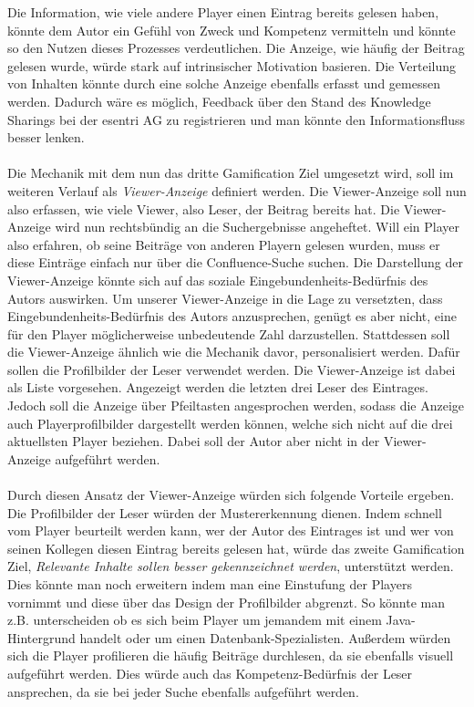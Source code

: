 \documentclass[a4paper,12pt,twoside]{scrartcl}
\begin{document}
Die Information, wie viele andere Player einen Eintrag bereits gelesen haben, könnte dem Autor ein Gefühl von Zweck und Kompetenz vermitteln und könnte so den Nutzen dieses Prozesses verdeutlichen. Die Anzeige, wie häufig der Beitrag gelesen wurde, würde stark auf intrinsischer Motivation basieren. Die Verteilung von Inhalten könnte durch eine solche Anzeige ebenfalls erfasst und gemessen werden. Dadurch wäre es möglich, Feedback über den Stand des Knowledge Sharings bei der esentri AG zu registrieren und man könnte den Informationsfluss besser lenken. 
\\\\
Die Mechanik mit dem nun das dritte Gamification Ziel umgesetzt wird, soll im weiteren Verlauf als \textit{Viewer-Anzeige} definiert werden. Die Viewer-Anzeige soll nun also erfassen, wie viele Viewer, also Leser, der Beitrag bereits hat. Die Viewer-Anzeige wird nun rechtsbündig an die Suchergebnisse angeheftet. Will ein Player also erfahren, ob seine Beiträge von anderen Playern gelesen wurden, muss er diese Einträge einfach nur über die Confluence-Suche suchen. Die Darstellung der Viewer-Anzeige könnte sich auf das soziale Eingebundenheits-Bedürfnis des Autors auswirken. Um unserer Viewer-Anzeige in die Lage zu versetzten, dass Eingebundenheits-Bedürfnis des Autors anzusprechen, genügt es aber nicht, eine für den Player möglicherweise unbedeutende Zahl darzustellen. Stattdessen soll die Viewer-Anzeige ähnlich wie die Mechanik davor, personalisiert werden. Dafür sollen die Profilbilder der Leser verwendet werden. Die Viewer-Anzeige ist dabei als Liste vorgesehen. Angezeigt werden die letzten drei Leser des Eintrages. Jedoch soll die Anzeige über Pfeiltasten angesprochen werden, sodass die Anzeige auch Playerprofilbilder dargestellt werden können, welche sich nicht auf die drei aktuellsten Player beziehen. Dabei soll der Autor aber nicht in der Viewer-Anzeige aufgeführt werden.
\\\\
Durch diesen Ansatz der Viewer-Anzeige würden sich folgende Vorteile ergeben. Die Profilbilder der Leser würden der Mustererkennung dienen. Indem schnell vom Player beurteilt werden kann, wer der Autor des Eintrages ist und wer von seinen Kollegen diesen Eintrag bereits gelesen hat, würde das zweite Gamification Ziel, \textit{Relevante Inhalte sollen besser gekennzeichnet werden}, unterstützt werden. Dies könnte man noch erweitern indem man eine Einstufung der Players vornimmt und diese über das Design der Profilbilder abgrenzt. So könnte man z.B. unterscheiden ob es sich beim Player um jemandem mit einem Java-Hintergrund handelt oder um einen Datenbank-Spezialisten. Außerdem würden sich die Player profilieren die häufig Beiträge durchlesen, da sie ebenfalls visuell aufgeführt werden. Dies würde auch das Kompetenz-Bedürfnis der Leser ansprechen, da sie bei jeder Suche ebenfalls aufgeführt werden.
\end{document}
